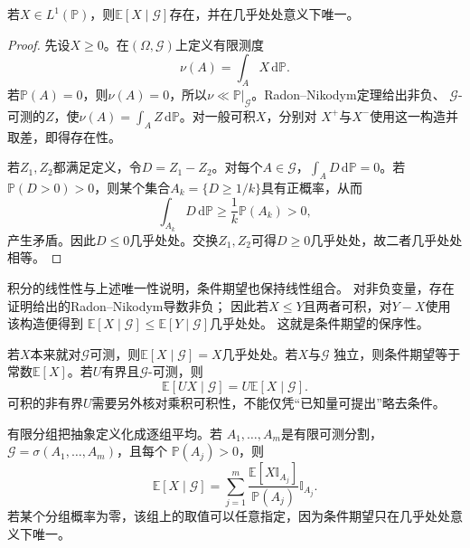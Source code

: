 \begin{theorem}[条件期望的存在与唯一性]
\label{thm:probability-conditional-expectation-existence}
若\(X\in L^1(\mathbb{P})\)，则\(\mathbb{E}[X\mid\mathcal{G}]\)存在，并在几乎处处意义下唯一。
\end{theorem}

\begin{proof}
先设\(X\geq0\)。在\((\Omega,\mathcal{G})\)上定义有限测度
\[ \nu(A)=\int_A X\,\mathrm{d}\mathbb{P}. \]
若\(\mathbb{P}(A)=0\)，则\(\nu(A)=0\)，所以\(\nu\ll\mathbb{P}|_{\mathcal{G}}\)。Radon--Nikodym定理给出非负、
\(\mathcal{G}\)-可测的\(Z\)，使\(\nu(A)=\int_A Z\,\mathrm{d}\mathbb{P}\)。对一般可积\(X\)，分别对
\(X^+\)与\(X^-\)使用这一构造并取差，即得存在性。

若\(Z_1,Z_2\)都满足定义，令\(D=Z_1-Z_2\)。对每个\(A\in\mathcal{G}\)，\(\int_A D\,\mathrm{d}\mathbb{P}=0\)。若
\(\mathbb{P}(D>0)>0\)，则某个集合\(A_k=\{D\geq1/k\}\)具有正概率，从而
\[ \int_{A_k}D\,\mathrm{d}\mathbb{P}
  \geq\frac{1}{k}\mathbb{P}(A_k)>0, \]
产生矛盾。因此\(D\leq0\)几乎处处。交换\(Z_1,Z_2\)可得\(D\geq0\)几乎处处，故二者几乎处处相等。
\end{proof}

积分的线性性与上述唯一性说明，条件期望也保持线性组合。
对非负变量，存在证明给出的Radon--Nikodym导数非负；
因此若\(X\leq Y\)且两者可积，对\(Y-X\)使用该构造便得到
\(\mathbb E[X\mid\mathcal G]\leq\mathbb E[Y\mid\mathcal G]\)几乎处处。
这就是条件期望的保序性。

若\(X\)本来就对\(\mathcal{G}\)可测，则\(\mathbb{E}[X\mid\mathcal{G}]=X\)几乎处处。若\(X\)与\(\mathcal{G}\)
独立，则条件期望等于常数\(\mathbb{E}[X]\)。若\(U\)有界且\(\mathcal{G}\)-可测，则
\begin{equation}
  \mathbb{E}[UX\mid\mathcal{G}]
  =
  U\mathbb{E}[X\mid\mathcal{G}].
  \label{eq:probability-taking-out-known-factor}
\end{equation}
可积的非有界\(U\)需要另外核对乘积可积性，不能仅凭“已知量可提出”略去条件。

有限分组把抽象定义化成逐组平均。若
\(A_1,\ldots,A_m\)是有限可测分割，
\(\mathcal{G}=\sigma(A_1,\ldots,A_m)\)，且每个
\(\mathbb{P}(A_j)>0\)，则
\begin{equation}
  \mathbb{E}[X\mid\mathcal{G}]
  =
  \sum_{j=1}^{m}
  \frac{\mathbb{E}[X\mathbb{I}_{A_j}]}
       {\mathbb{P}(A_j)}
  \mathbb{I}_{A_j}.
  \label{eq:probability-finite-partition-conditional-expectation}
\end{equation}
若某个分组概率为零，该组上的取值可以任意指定，因为条件期望只在几乎处处意义下唯一。

